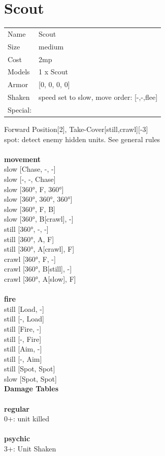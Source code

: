 {\section{ Scout }

\begin{tabular}{ll}
  Name & Scout \\
  Size & medium\\
  Cost & 2mp\\
  Models & 1 x Scout\\
  Armor & [0, 0, 0, 0]\\
  Shaken & speed set to slow, move order: [-,-,flee]\\
  Special: \\
\end{tabular}

\noindent Forward Position[2], Take-Cover[still,crawl][-3]\\ 
spot: detect enemy hidden units. See general rules\\ 


\ \\ {\bf movement } \\
slow [Chase, -, -] \\
slow [-, -, Chase] \\
slow [360°, F, 360°] \\
slow [360°, 360°, 360°] \\
slow [360°, F, B] \\
slow [360°, B[crawl], -] \\
still [360°, -, -] \\
still [360°, A, F] \\
still [360°, A[crawl], F] \\
crawl [360°, F, -] \\
crawl [360°, B[still], -] \\
crawl [360°, A[slow], F] \\
\ \\ {\bf fire } \\
still [Load, -] \\
still [-, Load] \\
still [Fire, -] \\
still [-, Fire] \\
still [Aim, -] \\
still [-, Aim] \\
still [Spot, Spot] \\
slow [Spot, Spot] \\


{\bf Damage Tables} \\
\ \\ {\bf regular } \\
0+: unit killed \\
\ \\ {\bf psychic } \\
3+: Unit Shaken \\


}
